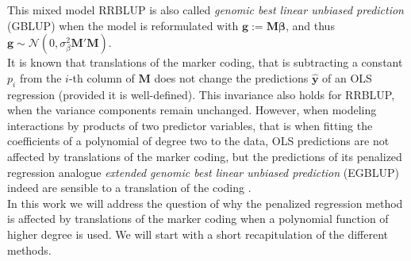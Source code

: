 \documentclass{bmcart}
\newcommand{\M}{\mathbf{M}}
\newcommand{\0}{\mathbf{0}}
\newcommand{\y}{\mathbf{y}}
\begin{document}
This mixed model RRBLUP is also called \emph{genomic best linear unbiased prediction} (GBLUP) when the model is reformulated with $\mathbf{g}:=\M \bm{\beta}$, and thus $\mathbf{g}\sim \mathcal{N}(0,\sigma_\beta^2 \M' \M)$. \\

It is known that translations of the marker coding, that is subtracting a constant $p_i$ from the $i$-th column of $\M$ does not change the predictions $\hat{\y}$ of an  OLS regression (provided it is well-defined). This invariance also holds for RRBLUP, when the variance components remain unchanged. However, when modeling interactions by products of two predictor variables, that is when fitting the coefficients of a polynomial of degree two to the data, OLS predictions are not affected by translations of the marker coding, but the predictions of its penalized regression analogue \emph{extended genomic best linear unbiased prediction} (EGBLUP) indeed are sensible to a translation of the coding \cite{he2016does,Martini17}.\\

In this work we will address the question of why the penalized regression method is affected by translations of the marker coding when a polynomial function of higher degree is used. 
We will start with a short recapitulation of the different methods.
\end{document}
